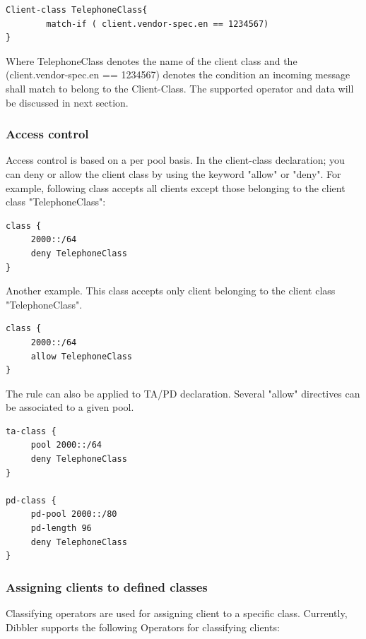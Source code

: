 \begin{lstlisting}
Client-class TelephoneClass{
        match-if ( client.vendor-spec.en == 1234567)
}
\end{lstlisting}

Where TelephoneClass denotes the name of the client class and the
(client.vendor-spec.en == 1234567) denotes the condition an incoming
message shall match to belong to the Client-Class. The supported
operator and data will be discussed in next section.


\subsubsection{Access control}
Access control is based on a per pool basis. In the client-class
declaration; you can deny or allow the client class by using the
keyword "allow" or "deny". For example, following class accepts all
clients except those belonging to the client class "TelephoneClass":

\begin{lstlisting}
class {
     2000::/64
     deny TelephoneClass
}
\end{lstlisting}

Another example. This class accepts only client belonging to the
client class "TelephoneClass". 

\begin{lstlisting}
class {
     2000::/64
     allow TelephoneClass
}
\end{lstlisting}

The rule can also be applied to TA/PD declaration. Several "allow"
directives can be associated to a given pool.

\begin{lstlisting}
ta-class {
     pool 2000::/64
     deny TelephoneClass
}

pd-class {
     pd-pool 2000::/80
     pd-length 96
     deny TelephoneClass
}
\end{lstlisting}

\subsubsection{Assigning clients to defined classes}
Classifying operators are used for assigning client to a specific class.
Currently, Dibbler supports the following Operators for classifying clients:

